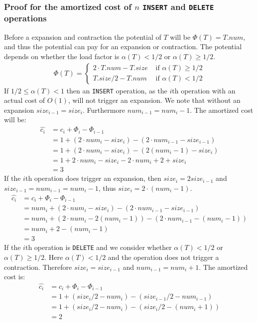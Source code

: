 \subsubsection*{Proof for the amortized cost of $n$ \texttt{INSERT} and
\texttt{DELETE} operations}
Before a expansion and contraction the potential of $T$ will be $\Phi(T)=T.num$,
and thus the potential can pay for an expansion or contraction. The potential
depends on whether the load factor is $\alpha(T)<1/2$ or $\alpha(T)\geq1/2$.
\begin{align*}
  \Phi(T)=
  \begin{cases}
    2\cdot T.num-T.size &\textrm{ if }\alpha(T)\geq1/2\\
    T.size/2-T.num&\textrm{ if }\alpha(T)<1/2
  \end{cases}
\end{align*}
If $1/2\leq\alpha(T)<1$ then an \texttt{INSERT} operation, as the $i$th
operation with an actual cost of $O(1)$, will not trigger an expansion. We note
that without an expansion $size_{i-1}=size_i$. Furthermore $num_{i-1}=num_i-1$.
The amortized cost will be:
\begin{align*}
  \hat{c_i}&=c_i+\Phi_i-\Phi_{i-1}\\
  &=1+(2\cdot num_i-size_i)-(2\cdot num_{i-1}-size_{i-1})\\
  &=1+(2\cdot num_i-size_i)-(2(num_i-1)-size_i)\\
  &=1+2\cdot num_i-size_i-2\cdot num_i+2+size_i\\
  &=3
\end{align*}
If the $i$th operation does trigger an expansion, then $size_i=2size_{i-1}$ and
$size_{i-1}=num_{i-1}=num_i-1$, thus $size_i=2\cdot(num_i-1)$.
\begin{align*}
  \hat{c_i}&=c_i+\Phi_i-\Phi_{i-1}\\
  &=num_i+(2\cdot num_i-size_i)-(2\cdot num_{i-1}-size_{i-1})\\
  &=num_i+(2\cdot num_i-2(num_i-1))-(2\cdot num_{i-1}-(num_i-1))\\
  &=num_i+2-(num_i-1)\\
  &=3
\end{align*}
If the $i$th operation is \texttt{DELETE} and we consider whether
$\alpha(T)<1/2$ or $\alpha(T)\geq1/2$. Here $\alpha(T)<1/2$ and the operation
does not trigger a contraction. Therefore $size_i=size_{i-1}$ and $num_{i-1}=
num_i+1$. The amortized cost is:
\begin{align*}
  \hat{c_i}&=c_i+\Phi_i-\Phi_{i-1}\\
  &=1+(size_i/2-num_i)-(size_{i-1}/2-num_{i-1})\\
  &=1+(size_i/2-num_i)-(size_i/2-(num_i+1))\\
  &=2
\end{align*}
